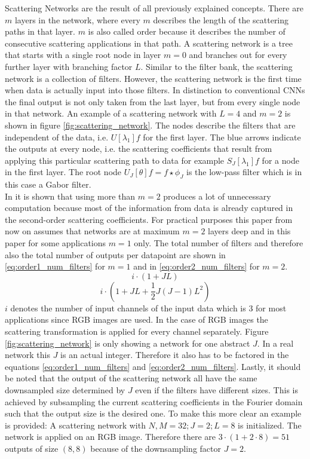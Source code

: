 Scattering Networks are the result of all previously explained concepts. There are $m$ layers in the network, where every $m$ describes the length of the scattering paths in that layer. $m$ is also called order because it describes the number of consecutive scattering applications in that path. A scattering network is a tree that starts with a single root node in layer $m=0$ and branches out for every further layer with branching factor $L$. Similar to the filter bank, the scattering network is a collection of filters. However, the scattering network is the first time when data is actually input into those filters. In distinction to conventional CNNs the final output is not only taken from the last layer, but from every single node in that network. An example of a scattering network with $L=4$ and $m=2$ is shown in figure \ref{fig:scattering_network}. The nodes describe the filters that are independent of the data, i.e. $U[\lambda_1]f$ for the first layer. The blue arrows indicate the outputs at every node, i.e. the scattering coefficients that result from applying this particular scattering path to data for example $S_J[\lambda_1]f$ for a node in the first layer. The root node $U_J[\theta]f = f \star \phi_J$ is the low-pass filter which is in this case a Gabor filter. \\
In \cite{scatteringTransform2012} it is shown that using more than $m=2$ produces a lot of unnecessary computation because most of the information from data is already captured in the second-order scattering coefficients. For practical purposes this paper from now on assumes that networks are at maximum $m=2$ layers deep and in this paper for some applications $m=1$ only. 
The total number of filters and therefore also the total number of outputs per datapoint are shown in \ref{eq:order1_num_filters} for $m=1$ and in \ref{eq:order2_num_filters} for $m=2$.
\begin{equation}
	i \cdot (1 + JL) 
	\label{eq:order1_num_filters}
\end{equation} 
\begin{equation}
	i \cdot (1 + JL + \frac{1}{2}J(J-1)L^2)
	\label{eq:order2_num_filters}
\end{equation}
$i$ denotes the number of input channels of the input data which is 3 for most applications since RGB images are used. In the case of RGB images the scattering transformation is applied for every channel separately. Figure \ref{fig:scattering_network} is only showing a network for one abstract $J$. In a real network this $J$ is an actual integer. Therefore it also has to be factored in the equations \ref{eq:order1_num_filters} and \ref{eq:order2_num_filters}. Lastly, it should be noted that the output of the scattering network all have the same downsampled size determined by $J$ even if the filters have different sizes. This is achieved by subsampling the current scattering coefficients in the Fourier domain such that the output size is the desired one. To make this more clear an example is provided: A scattering network with $N,M = 32; J=2; L=8$ is initialized. The network is applied on an RGB image. Therefore there are $3 \cdot (1+2 \cdot 8) = 51$ outputs of size $(8,8)$ because of the downsampling factor $J=2$. 
